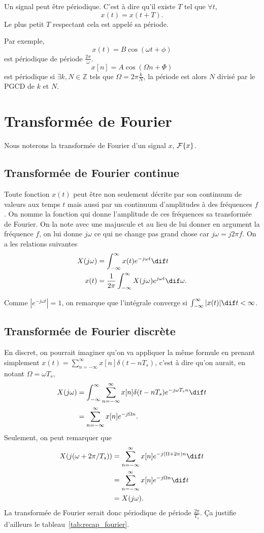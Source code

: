 Un signal peut être périodique.
C'est à dire qu'il existe $T$ tel que
$\forall t$,
\[ x(t) = x(t + T). \]
Le plus petit $T$ respectant cela est appelé sa période.

Par exemple,
\[ x(t) = B\cos(\omega t + \phi) \]
est périodique de période $\frac{2\pi}{\omega}$.
\[ x[n] = A\cos(\Omega n + \Phi) \]
est périodique si $\exists k, N \in \mathbb{Z}$ tels que
$\Omega = 2\pi\frac{k}{N}$, la période est alors $N$ divisé
par le PGCD de $k$ et $N$.

\section{Transformée de Fourier}
Nous noterons la transformée de Fourier d'un signal $x$, $\mathcal{F}\{x\}$.

\subsection{Transformée de Fourier continue}
Toute fonction $x(t)$ peut être non seulement décrite par son continuum de
valeurs aux temps $t$ mais aussi par un continuum d'amplitudes à des fréquences
$f$.
On nomme la fonction qui donne l'amplitude de ces fréquences sa transformée
de Fourier.
On la note avec une majuscule et au lieu de lui donner en argument la fréquence
$f$, on lui donne $j\omega$ ce qui ne change pas grand chose car
$j\omega = j2\pi f$.
On a les relations suivantes
\begin{align}
  \label{eq:tfc}
  X(j\omega) & = \int_{-\infty}^\infty x(t) e^{-j\omega t} \dif t\\
  \nonumber
  x(t) & = \frac{1}{2\pi} \int_{-\infty}^\infty X(j\omega) e^{j\omega t}
  \dif \omega.
\end{align}

Comme $|e^{-j\omega t}| = 1$, on remarque que l'intégrale
converge si $\int_{-\infty}^\infty |x(t)| \dif t < \infty$.

\subsection{Transformée de Fourier discrète}
\label{sec:fourier_discret}
En discret, on pourrait imaginer qu'on va appliquer la même formule en prenant
simplement $x(t) =  \sum_{n=-\infty}^\infty x[n] \delta(t-nT_s)$, c'est à dire
qu'on aurait, en notant $\Omega = \omega T_s$,
\begin{align}
  \label{eq:tfd}
  X(j\omega) & = \int_{-\infty}^\infty \sum_{n=-\infty}^\infty x[n]
  \delta(t-nT_s) e^{-j\omega T_sn} \dif t\\
  \nonumber
  & = \sum_{n=-\infty}^\infty x[n] e^{-j\Omega n}.
\end{align}
Seulement, on peut remarquer que
\begin{align*}
  X(j(\omega+2\pi/T_s)) & = \sum_{n=-\infty}^\infty x[n]
  e^{-j(\Omega+2\pi) n} \dif t\\
  & = \sum_{n=-\infty}^\infty x[n]
  e^{-j\Omega n} \dif t\\
  & = X(j\omega).
\end{align*}
La transformée de Fourier serait donc périodique de période $\frac{2\pi}{T_s}$.
Ça justifie d'ailleurs le tableau~\ref{tab:recap_fourier}.

